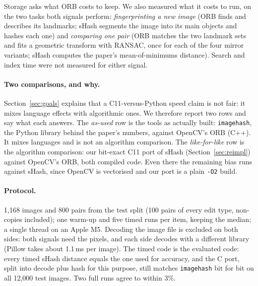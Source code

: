 Storage asks what ORB costs to keep. We also measured what it costs to run, on the two tasks
both signals perform: \emph{fingerprinting a new image} (ORB finds and describes its
landmarks; sHash segments the image into its main objects and hashes each one) and
\emph{comparing one pair} (ORB matches the two landmark sets and fits a geometric transform
with RANSAC, once for each of the four mirror variants; sHash computes the paper's
mean-of-minimums distance). Search and index time were not measured for either signal.

\paragraph{Two comparisons, and why.} Section~\ref{sec:goals} explains that a C11-versus-Python
speed claim is not fair: it mixes language effects with algorithmic ones. We therefore report
two rows and say what each answers. The \emph{as-used} row is the tools as actually built:
\texttt{imagehash}, the Python library behind the paper's numbers, against OpenCV's ORB (C++).
It mixes languages and is not an algorithm comparison. The \emph{like-for-like} row is the
algorithm comparison: our bit-exact C11 port of sHash (Section~\ref{sec:reimpl}) against
OpenCV's ORB, both compiled code. Even there the remaining bias runs against sHash, since
OpenCV is vectorised and our port is a plain \texttt{-O2} build.

\paragraph{Protocol.} 1,168 images and 800 pairs from the test split (100 pairs of every edit
type, non-copies included); one warm-up and five timed runs per item, keeping the median; a
single thread on an Apple M5. Decoding the image file is excluded on both sides: both signals
need the pixels, and each side decodes with a different library (Pillow takes about 1.1\,ms
per image). The timed code is the evaluated code: every timed sHash distance equals the one
used for accuracy, and the C port, split into decode plus hash for this purpose, still matches
\texttt{imagehash} bit for bit on all 12,000 test images. Two full runs agree to within 3\%.

